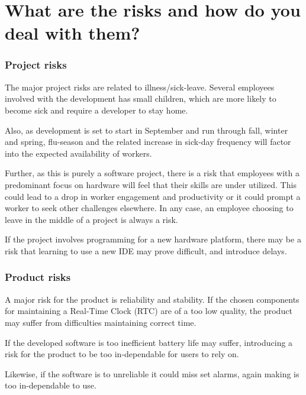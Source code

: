 \documentclass[Main]{subfiles}
\begin{document}
\section{What are the risks and how do you deal with them?}

\subsubsection{Project risks} %
\label{sub:project_risks}

The major project risks are related to illness/sick-leave.
Several employees involved with the development has small children, which are more likely to become sick and require a developer to stay home.

Also, as development is set to start in September and run through fall, winter and spring, flu-season and the related increase in sick-day frequency will factor into the expected availability of workers.

Further, as this is purely a software project, there is a risk that employees with a predominant focus on hardware will feel that their skills are under utilized. 
This could lead to a drop in worker engagement and productivity or it could prompt a worker to seek other challenges elsewhere.
In any case, an employee choosing to leave in the middle of a project is always a risk.

If the project involves programming for a new hardware platform, there may be a risk that learning to use a new IDE may prove difficult, and introduce delays.


\subsubsection{Product risks} %
\label{sub:product_risks}

A major risk for the product is reliability and stability.
If the chosen components for maintaining a Real-Time Clock (RTC) are of a too low quality, the product may suffer from difficulties maintaining correct time.

If the developed software is too inefficient battery life may suffer, introducing a risk for the product to be too in-dependable for users to rely on.

Likewise, if the software is to unreliable it could miss set alarms, again making is too in-dependable to use.

\end{document}
